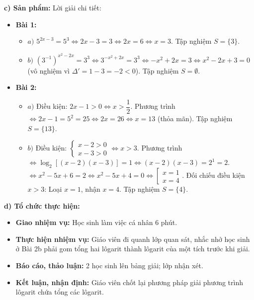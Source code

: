 \documentclass[12pt, a4paper]{article}
\begin{document}
\noindent \textbf{c) Sản phẩm:}
Lời giải chi tiết:
\begin{itemize}
    \item \textbf{Bài 1:}
    \begin{itemize}
        \item $a)$ $5^{2x - 3} = 5^3 \iff 2x - 3 = 3 \iff 2x = 6 \iff x = 3$. Tập nghiệm $S = \{3\}$.
        \item $b)$ $\left(3^{-1}\right)^{x^2 - 2x} = 3^3 \iff 3^{-x^2 + 2x} = 3^3 \iff -x^2 + 2x = 3 \iff x^2 - 2x + 3 = 0$ (vô nghiệm vì $\Delta' = 1 - 3 = -2 < 0$). Tập nghiệm $S = \emptyset$.
    \end{itemize}
    \item \textbf{Bài 2:}
    \begin{itemize}
        \item $a)$ Điều kiện: $2x - 1 > 0 \iff x > \dfrac{1}{2}$.
        Phương trình $\iff 2x - 1 = 5^2 = 25 \iff 2x = 26 \iff x = 13$ (thỏa mãn). Tập nghiệm $S = \{13\}$.
        \item $b)$ Điều kiện: $\begin{cases} x - 2 > 0 \\ x - 3 > 0 \end{cases} \iff x > 3$.
        Phương trình $\iff \log_2 [(x - 2)(x - 3)] = 1 \iff (x - 2)(x - 3) = 2^1 = 2$.
        $\iff x^2 - 5x + 6 = 2 \iff x^2 - 5x + 4 = 0 \iff \left[\begin{array}{l} x = 1 \\ x = 4 \end{array}\right.$.
        Đối chiếu điều kiện $x > 3$: Loại $x = 1$, nhận $x = 4$. Tập nghiệm $S = \{4\}$.
    \end{itemize}
\end{itemize}

\noindent \textbf{d) Tổ chức thực hiện:}
\begin{itemize}[leftmargin=0.6cm]
    \item \textbf{Giao nhiệm vụ:} Học sinh làm việc cá nhân 6 phút.
    \item \textbf{Thực hiện nhiệm vụ:} Giáo viên đi quanh lớp quan sát, nhắc nhở học sinh ở Bài 2b phải gom tổng hai lôgarit thành lôgarit của một tích trước khi giải.
    \item \textbf{Báo cáo, thảo luận:} 2 học sinh lên bảng giải; lớp nhận xét.
    \item \textbf{Kết luận, nhận định:} Giáo viên chốt lại phương pháp giải phương trình lôgarit chứa tổng các lôgarit.
\end{itemize}
\end{document}
